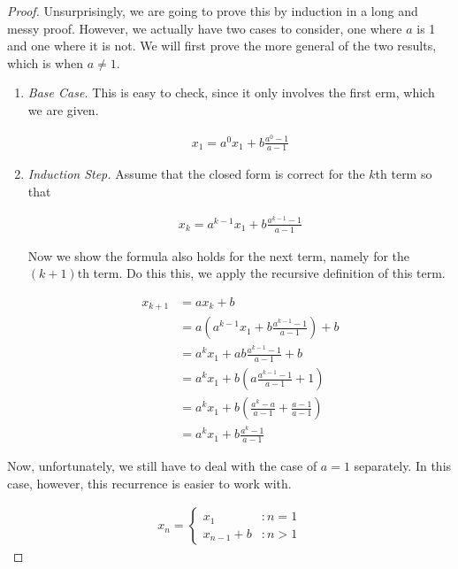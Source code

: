 \documentclass[twoside]{report}
\begin{document}
\begin{proof}
	Unsurprisingly, we are going to prove this by induction in a long and messy proof. However, we actually have two cases to consider, one where $a$ is 1 and one where it is not. We will first prove the more general of the two results, which is when $a \neq 1$.
	
	\begin{enumerate}
		\item \emph{Base Case.} This is easy to check, since it only involves the first erm, which we are given.
		
		\begin{align*}
			x_1 =  a^0 x_1 + b \frac{a^0 - 1}{a - 1}
		\end{align*}
		\item \emph{Induction Step.} Assume that the closed form is correct for the $k$th term so that
		
		\begin{align*}
			x_k = a^{k - 1} x_1 + b \frac{a^{k - 1} - 1}{a - 1}
		\end{align*}
		
		Now we show the formula also holds for the next term, namely for the $(k + 1)$th term. Do this this, we apply the recursive definition of this term.
		
		\begin{align*}
			x_{k + 1} &= a x_k + b \\
			&= a \left( a^{k - 1} x_1 + b \frac{a^{k - 1} - 1}{a - 1} \right) + b \\
			&= a^k x_1 + ab \frac{a^{k - 1} - 1}{a - 1} + b \\
			&= a^k x_1 + b \left( a \frac{a^{k - 1} - 1}{a - 1} + 1 \right) \\
			&= a^k x_1 + b \left( \frac{a^k - a}{a - 1} + \frac{a - 1}{a - 1} \right) \\
			&= a^k x_1 + b \frac{a^k - 1}{a - 1}
		\end{align*}
	\end{enumerate}
	
	Now, unfortunately, we still have to deal with the case of $a = 1$ separately. In this case, however, this recurrence is easier to work with.
	
	\begin{align*}
		x_n =
		\begin{cases}
			x_1 &: n = 1 \\
			x_{n - 1} + b &: n > 1
		\end{cases}
	\end{align*}
	

\end{proof}
\end{document}
